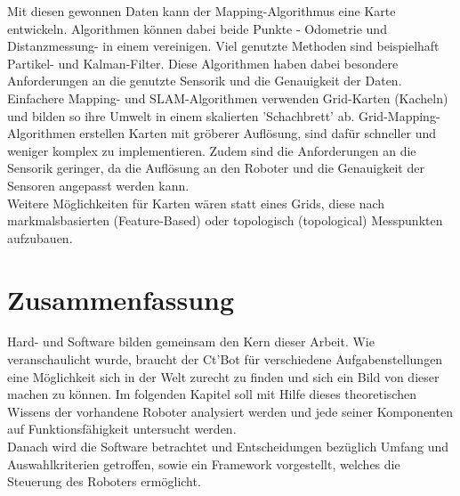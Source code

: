 \documentclass[twoside,11pt, a4paper]{report}
\begin{document}
	Mit diesen gewonnen Daten kann der Mapping-Algorithmus eine Karte entwickeln. Algorithmen können dabei beide Punkte - Odometrie und Distanzmessung- in einem vereinigen. Viel genutzte Methoden sind beispielhaft Partikel- und Kalman-Filter. Diese Algorithmen haben dabei besondere Anforderungen an die genutzte Sensorik und die Genauigkeit der Daten.\\
	Einfachere Mapping- und SLAM-Algorithmen verwenden Grid-Karten (Kacheln) und bilden so ihre Umwelt in einem skalierten 'Schachbrett' ab. Grid-Mapping-Algorithmen erstellen Karten mit gröberer Auflösung, sind dafür schneller und weniger komplex zu implementieren. Zudem sind die Anforderungen an die Sensorik geringer, da die Auflösung an den Roboter und die Genauigkeit der Sensoren angepasst werden kann.\\
	Weitere Möglichkeiten für Karten wären statt eines Grids, diese nach markmalsbasierten (Feature-Based) oder topologisch (topological) Messpunkten aufzubauen. 
	
	
	\section{Zusammenfassung}
	Hard- und Software bilden gemeinsam den Kern dieser Arbeit. Wie veranschaulicht wurde, braucht der Ct'Bot für verschiedene Aufgabenstellungen eine Möglichkeit sich in der Welt zurecht zu finden und sich ein Bild von dieser machen zu können. Im folgenden Kapitel soll mit Hilfe dieses theoretischen Wissens der vorhandene Roboter analysiert werden und jede seiner Komponenten auf Funktionsfähigkeit untersucht werden. \\
	Danach wird die Software betrachtet und Entscheidungen bezüglich Umfang und Auswahlkriterien getroffen, sowie ein Framework vorgestellt, welches die Steuerung des Roboters ermöglicht. 
	
	
	
	
	
	
	
	
	
\end{document}
